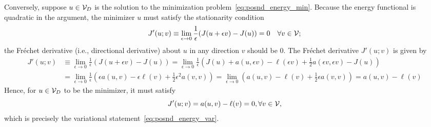 Conversely, suppose $u \in \mathcal{V}_D$ is the solution to the minimization problem~\eqref{eq:posnd_energy_min}. Because the energy functional is quadratic in the argument, the minimizer $u$ must satisfy the stationarity condition
\begin{equation*}
  J'(u;v) \equiv \lim_{\epsilon \to 0} \frac{1}{\epsilon}(J(u+\epsilon v) - J(u)) = 0 \quad \forall v \in \mathcal{V};
\end{equation*}
the Fr\'echet derivative (i.e., directional derivative) about $u$ in any direction $v$ should be 0. The Fr\'echet derivative $J'(u;v)$ is given by
\begin{align*}
  J'(u;v)
  &\equiv
  \lim_{\epsilon \to 0} \frac{1}{\epsilon}(J(u+\epsilon v) - J(u))
  = \lim_{\epsilon \to 0} \frac{1}{\epsilon}(J(u) + a(u,\epsilon v) - \ell(\epsilon v) + \frac{1}{2} a(\epsilon v, \epsilon v) - J(u))
  \\
  &= \lim_{\epsilon \to 0} \frac{1}{\epsilon} (\epsilon a(u,v) - \epsilon \ell(v) + \frac{1}{2} \epsilon^2 a(v,v))
  = \lim_{\epsilon \to 0} (a(u,v) - \ell(v) + \frac{1}{2} \epsilon a(v,v))
  = a(u,v) - \ell(v) 
\end{align*}
Hence, for $u \in \mathcal{V}_D$ to be the minimizer, it must satisfy
\begin{equation*}
  J'(u;v) = a(u,v) - \ell(v) = 0, \forall v \in \mathcal{V},
\end{equation*}
which is precisely the variational statement~\eqref{eq:posnd_energy_var}.


